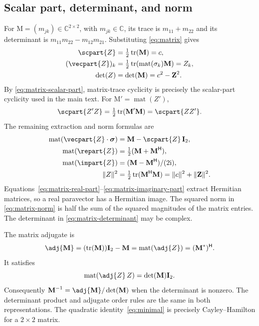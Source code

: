 \documentclass[11pt]{article}
\newcommand{\pv}[1]{{#1}}
\newcommand{\pvGreek}[1]{{#1}}
\newcommand{\vstyle}[1]{{\bm{\mathrm{#1}}}}
\newcommand{\pZ}{\pv{Z}}
\newcommand{\pvsigma}{\pvGreek{\sigma}}
\numberwithin{equation}{section}
\newcommand{\C}{\mathbb{C}}
\newcommand{\ii}{\mathrm{i}}
\newcommand{\dotprod}{\cdot}
\newcommand{\bsig}{\vstyle{\sigma}}
\newcommand{\bZ}{\vstyle{Z}}
\newcommand{\bM}{\vstyle{M}}
\newcommand{\bI}{\vstyle{I}}
\begin{document}
\subsection{Scalar part, determinant, and norm}

For $\bM=(m_{jk})\in\C^{2\times2}$, with $m_{jk}\in\C$, its trace is $m_{11}+m_{22}$ and its determinant
is $m_{11}m_{22}-m_{12}m_{21}$.  Substituting \eqref{eq:matrix} gives
\begin{align}
 \scpart {\pZ}&=\tfrac12\operatorname{tr}(\bM)=c,
 \label{eq:matrix-scalar-part}\\
 (\vecpart {\pZ})_k&=\tfrac12\operatorname{tr}
                    (\operatorname{mat}(\pvsigma_k)\bM)=Z_k,\notag\\
 \det(\pZ)&=\det(\bM)=c^2-\bZ^2.
 \label{eq:matrix-determinant}
\end{align}
By \eqref{eq:matrix-scalar-part}, matrix-trace cyclicity is precisely the scalar-part cyclicity used
in the main text.  For $\bM'=\operatorname{mat}(\pZ')$,
\[
 \scpart{\pZ'\pZ}=\tfrac12\operatorname{tr}(\bM'\bM)
             =\scpart{\pZ \pZ'}.
\]
The remaining extraction and norm formulas are
\begin{align}
 \operatorname{mat}(\vecpart {\pZ}\dotprod\bsig)&=\bM-\scpart {\pZ}\,\bI_2,\notag\\
 \operatorname{mat}(\repart {\pZ})&=\tfrac12(\bM+\bM^{\mathsf H}),
 \label{eq:matrix-real-part}\\
 \operatorname{mat}(\impart {\pZ})&=(\bM-\bM^{\mathsf H})/(2\ii),
 \label{eq:matrix-imaginary-part}\\
 \lVert \pZ\rVert^2&=\tfrac12\operatorname{tr}(\bM^{\mathsf H}\bM)
                  =\lVert c\rVert^2+\lVert\bZ\rVert^2.
 \label{eq:matrix-norm}
\end{align}
Equations~\eqref{eq:matrix-real-part}--\eqref{eq:matrix-imaginary-part}
extract Hermitian matrices, so a real paravector has a Hermitian image.
The squared norm in \eqref{eq:matrix-norm} is half the sum of the squared
magnitudes of the matrix entries.  The determinant in
\eqref{eq:matrix-determinant} may be complex.

The matrix adjugate is
\begin{equation*}
 \adj\bM=(\operatorname{tr}(\bM))\bI_2-\bM
        =\operatorname{mat}(\adj {\pZ})=(\bM^*)^{\mathsf H}.
\end{equation*}
It satisfies
\begin{equation*}
 \operatorname{mat}(\adj {\pZ}\,\pZ)=\det(\bM)\bI_2.
\end{equation*}
Consequently $\bM^{-1}=\adj\bM/\det(\bM)$ when the determinant is
nonzero.  The determinant product and adjugate order rules are the same
in both representations.  The quadratic identity~\eqref{eq:minimal} is
precisely Cayley--Hamilton for a $2\times2$ matrix.
\end{document}
